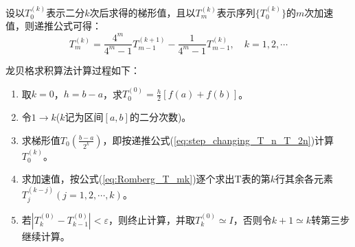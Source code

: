 设以$T_0^{(k)}$表示二分$k$次后求得的梯形值，且以$T_m^{(k)}$表示序列$\{T_0^{(k)}\}$的$m$次加速值，则递推公式可得：
\begin{equation}
    T_m^{(k)} = \frac{4^m}{4^m - 1} T_{m-1}^{(k+1)} - \frac{1}{4^m -1} T_{m-1}^{(k)}, \quad k=1,2,\cdots
    \label{eq:Romberg_T_mk}
\end{equation}

龙贝格求积算法计算过程如下：
\begin{enumerate}
    \item 取$k=0$，$h=b-a$，求$T_0^{(0)} = \frac{h}{2} [f(a) + f(b)]$。
    \item 令$1\longrightarrow k$($k$记为区间$[a,b]$的二分次数)。
    \item 求梯形值$T_0\left(\frac{b-a}{2^k}\right)$，即按递推公式(\ref{eq:step_changing_T_n_T_2n})计算$T_0^{(k)}$。
    \item 求加速值，按公式(\ref{eq:Romberg_T_mk})逐个求出T表的第$k$行其余各元素$T_j^{(k-j)}(j=1,2,\cdots,k)$。
    \item 若$|T_k^{(0)} - T_{k-1}^{(0)}|<\varepsilon $，则终止计算，并取$T_k^{(0)}\simeq I$，否则令$k+1\simeq k$转第三步继续计算。
\end{enumerate}

